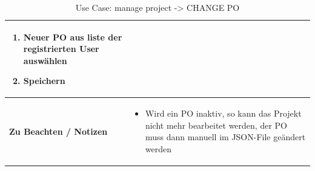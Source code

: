 \begin{table}[H]
\begin{tabulary}{1.0\textwidth}{|m{4cm}|m{9cm}|}
\begin{enumerate}
        \item Neuer PO aus liste der registrierten User auswählen
        \item Speichern
        \end{enumerate}\\ 
      \hline
      \textbf{Zu Beachten / Notizen} &
      \begin{itemize}
        \item Wird ein PO inaktiv, so kann das Projekt nicht mehr bearbeitet werden,
        der PO muss dann manuell im JSON-File geändert werden
        \end{itemize}\\ 
      \hline
    \end{tabulary}
    \caption{Use Case: manage project -> CHANGE PO}
  \end{table}
